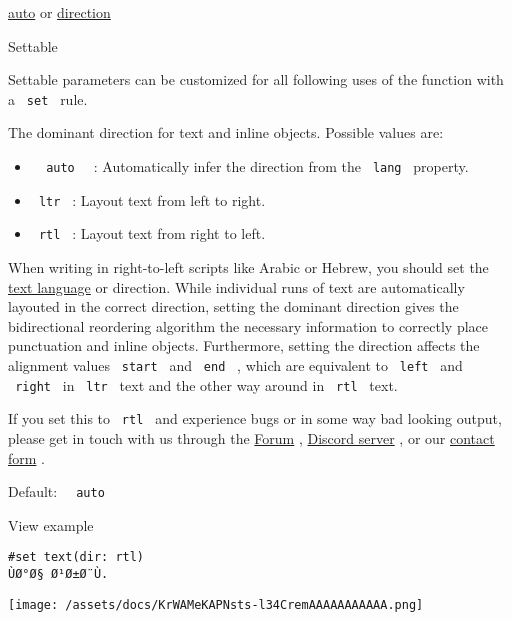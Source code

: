 \href{/docs/reference/foundations/auto/}{auto} {or}
\href{/docs/reference/layout/direction/}{direction}

{{ Settable }}

\label{parameters-dir-settable-tooltip}
Settable parameters can be customized for all following uses of the
function with a \texttt{\ set\ } rule.

The dominant direction for text and inline objects. Possible values are:

\begin{itemize}
\tightlist
\item
  \texttt{\ }{\texttt{\ auto\ }}\texttt{\ } : Automatically infer the
  direction from the \texttt{\ lang\ } property.
\item
  \texttt{\ ltr\ } : Layout text from left to right.
\item
  \texttt{\ rtl\ } : Layout text from right to left.
\end{itemize}

When writing in right-to-left scripts like Arabic or Hebrew, you should
set the \href{/docs/reference/text/text/\#parameters-lang}{text
language} or direction. While individual runs of text are automatically
layouted in the correct direction, setting the dominant direction gives
the bidirectional reordering algorithm the necessary information to
correctly place punctuation and inline objects. Furthermore, setting the
direction affects the alignment values \texttt{\ start\ } and
\texttt{\ end\ } , which are equivalent to \texttt{\ left\ } and
\texttt{\ right\ } in \texttt{\ ltr\ } text and the other way around in
\texttt{\ rtl\ } text.

If you set this to \texttt{\ rtl\ } and experience bugs or in some way
bad looking output, please get in touch with us through the
\href{https://forum.typst.app/}{Forum} ,
\href{https://discord.gg/2uDybryKPe}{Discord server} , or our
\href{https://typst.app/contact}{contact form} .

Default: \texttt{\ }{\texttt{\ auto\ }}\texttt{\ }


View example

\begin{verbatim}
#set text(dir: rtl)
ÙØ°Ø§ Ø¹Ø±Ø¨Ù.
\end{verbatim}

\texttt{[image: /assets/docs/KrWAMeKAPNsts-l34CremAAAAAAAAAAA.png]}


